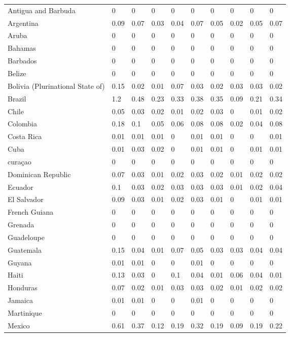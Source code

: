 \begin{longtable}[t]{llllllllll}
Antigua and Barbuda & 0 & 0 & 0 & 0 & 0 & 0 & 0 & 0 & 0\\
Argentina & 0.09 & 0.07 & 0.03 & 0.04 & 0.07 & 0.05 & 0.02 & 0.05 & 0.07\\
Aruba & 0 & 0 & 0 & 0 & 0 & 0 & 0 & 0 & 0\\
Bahamas & 0 & 0 & 0 & 0 & 0 & 0 & 0 & 0 & 0\\
Barbados & 0 & 0 & 0 & 0 & 0 & 0 & 0 & 0 & 0\\
Belize & 0 & 0 & 0 & 0 & 0 & 0 & 0 & 0 & 0\\
Bolivia (Plurinational State of) & 0.15 & 0.02 & 0.01 & 0.07 & 0.03 & 0.02 & 0.03 & 0.03 & 0.02\\
Brazil & 1.2 & 0.48 & 0.23 & 0.33 & 0.38 & 0.35 & 0.09 & 0.21 & 0.34\\
Chile & 0.05 & 0.03 & 0.02 & 0.01 & 0.02 & 0.03 & 0 & 0.01 & 0.02\\
Colombia & 0.18 & 0.1 & 0.05 & 0.06 & 0.08 & 0.08 & 0.02 & 0.04 & 0.08\\
Costa Rica & 0.01 & 0.01 & 0.01 & 0 & 0.01 & 0.01 & 0 & 0 & 0.01\\
Cuba & 0.01 & 0.03 & 0.02 & 0 & 0.01 & 0.01 & 0 & 0.01 & 0.01\\
curaçao & 0 & 0 & 0 & 0 & 0 & 0 & 0 & 0 & 0\\
Dominican Republic & 0.07 & 0.03 & 0.01 & 0.02 & 0.03 & 0.02 & 0.01 & 0.02 & 0.02\\
Ecuador & 0.1 & 0.03 & 0.02 & 0.03 & 0.03 & 0.03 & 0.01 & 0.02 & 0.04\\
El Salvador & 0.09 & 0.03 & 0.01 & 0.02 & 0.03 & 0.01 & 0 & 0.01 & 0.01\\
French Guiana & 0 & 0 & 0 & 0 & 0 & 0 & 0 & 0 & 0\\
Grenada & 0 & 0 & 0 & 0 & 0 & 0 & 0 & 0 & 0\\
Guadeloupe & 0 & 0 & 0 & 0 & 0 & 0 & 0 & 0 & 0\\
Guatemala & 0.15 & 0.04 & 0.01 & 0.07 & 0.05 & 0.03 & 0.03 & 0.04 & 0.04\\
Guyana & 0.01 & 0.01 & 0 & 0 & 0.01 & 0 & 0 & 0 & 0\\
Haiti & 0.13 & 0.03 & 0 & 0.1 & 0.04 & 0.01 & 0.06 & 0.04 & 0.01\\
Honduras & 0.07 & 0.02 & 0.01 & 0.03 & 0.03 & 0.02 & 0.01 & 0.02 & 0.02\\
Jamaica & 0.01 & 0.01 & 0 & 0 & 0.01 & 0 & 0 & 0 & 0\\
Martinique & 0 & 0 & 0 & 0 & 0 & 0 & 0 & 0 & 0\\
Mexico & 0.61 & 0.37 & 0.12 & 0.19 & 0.32 & 0.19 & 0.09 & 0.19 & 0.22\\

\end{longtable}
